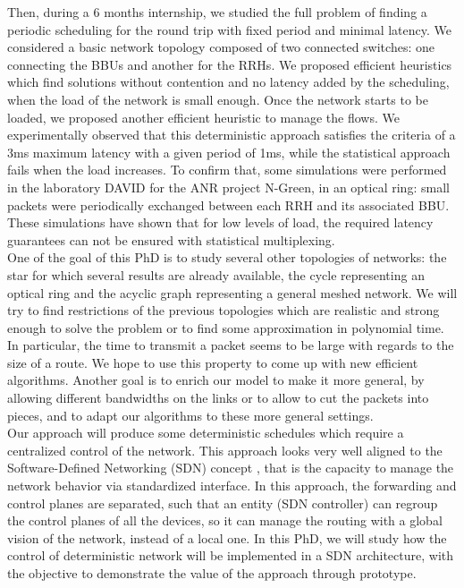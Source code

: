 \documentclass{article}
\begin{document}
Then, during a 6 months internship, we studied the full problem of finding a periodic scheduling for the round trip with fixed period and minimal latency. We considered a basic network topology composed of two connected switches: one connecting the BBUs and another for the RRHs. We proposed efficient heuristics which find solutions without contention and no latency added by the scheduling, when the load of the network is small enough. Once the network starts to be loaded, we proposed another efficient heuristic to manage the flows. We experimentally observed that this deterministic approach satisfies the criteria of a 3ms maximum latency with a given period of 1ms, while the statistical approach fails when the load increases. To confirm that, some simulations were performed in the laboratory DAVID for the ANR project N-Green, in an optical ring: small packets were periodically exchanged between each RRH and its associated BBU. These simulations have shown that for low levels of load, the required latency guarantees can not be ensured with statistical multiplexing.\\

One of the goal of this PhD is to study several other topologies of networks: the star for which several results are already available, the cycle representing an optical ring and the acyclic graph representing a general meshed network. We will try to find restrictions of the previous topologies which are realistic and strong enough to solve the problem or to find some approximation in polynomial time. In particular, the time to transmit a packet seems to be large with regards to the size of a route. We hope to use this property to come up with new efficient algorithms.
Another goal is to enrich our model to make it more general, by allowing different bandwidths on the links or to allow to cut the packets into pieces, and to adapt our algorithms to these more general settings.\\

Our approach will produce some deterministic schedules which require a centralized control of the network. This approach looks very well aligned to the Software-Defined Networking (SDN) concept \cite{haleplidis2015software}, that is the capacity to manage the network behavior via standardized interface. In this approach, the forwarding and control planes are separated, such that an entity (SDN controller) can regroup the control planes of all the devices, so it can manage the routing with a global vision of the network, instead of a local one. In this PhD, we will study how the control of deterministic network will be implemented in a SDN architecture, with the objective to demonstrate the value of the approach through prototype.\\
\end{document}
